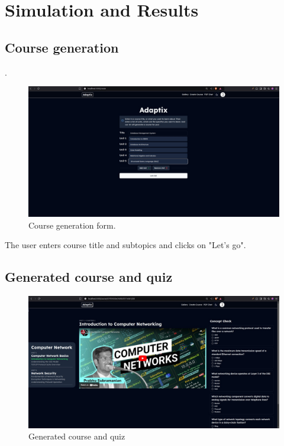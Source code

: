 
\chapter{Simulation and Results} %

\label{Chapter4} 

\section{Course generation}.

\begin{figure}[H]
    \centering
    \includegraphics[scale=0.28]{Images/adaptrix-course-gen.jpeg}    
    \caption{Course generation form.}
    \label{fig:course-gen-form}
\end{figure}

The user enters course title and subtopics and clicks on "Let's go".

\section{Generated course and quiz}

\begin{figure}[H]
    \centering
    \includegraphics[scale=0.28]{Images/couse-and-quiz.jpeg}
    \caption{Generated course and quiz}
    \label{fig:generated-course}
\end{figure}

